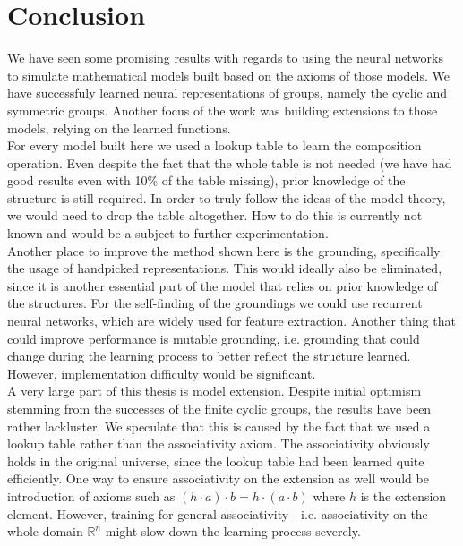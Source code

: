 \chapter*{Conclusion}
We have seen some promising results with regards to using the neural networks to simulate mathematical models built based on the axioms of those models. We have successfuly learned neural representations of groups, namely the cyclic and symmetric groups. Another focus of the work was building extensions to those models, relying on the learned functions.\\

For every model built here we used a lookup table to learn the composition operation. Even despite the fact that the whole table is not needed (we have had good results even with 10\% of the table missing), prior knowledge of the structure is still required. In order to truly follow the ideas of the model theory, we would need to drop the table altogether. How to do this is currently not known and would be a subject to further experimentation.\\

Another place to improve the method shown here is the grounding, specifically the usage of handpicked representations. This would ideally also be eliminated, since it is another essential part of the model that relies on prior knowledge of the structures. For the self-finding of the groundings we could use recurrent neural networks, which are widely used for feature extraction. Another thing that could improve performance is mutable grounding, i.e. grounding that could change during the learning process to better reflect the structure learned. However, implementation difficulty would be significant.\\

A very large part of this thesis is model extension. Despite initial optimism stemming from the successes of the finite cyclic groups, the results have been rather lackluster. We speculate that this is caused by the fact that we used a lookup table rather than the associativity axiom. The associativity obviously holds in the original universe, since the lookup table had been learned quite efficiently. One way to ensure associativity on the extension as well would be introduction of axioms such as $(h\cdot a)\cdot b = h\cdot (a\cdot b)$ where $h$ is the extension element. However, training for general associativity - i.e. associativity on the whole domain $\mathbb{R}^n$ might slow down the learning process severely.\\

